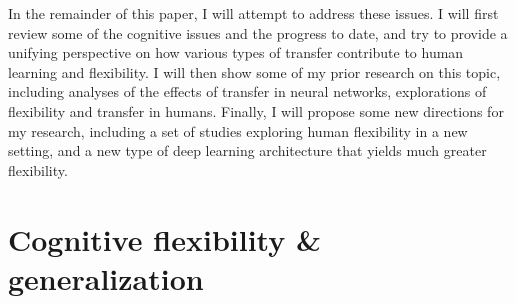 In the remainder of this paper, I will attempt to address these issues. I will first review some of the cognitive issues and the progress to date, and try to provide a unifying perspective on how various types of transfer contribute to human learning and flexibility. I will then show some of my prior research on this topic, including analyses of the effects of transfer in neural networks, explorations of flexibility and transfer in humans. Finally, I will propose some new directions for my research, including a set of studies exploring human flexibility in a new setting, and a new type of deep learning architecture that yields much greater flexibility. \par

\section{Cognitive flexibility \& generalization}

